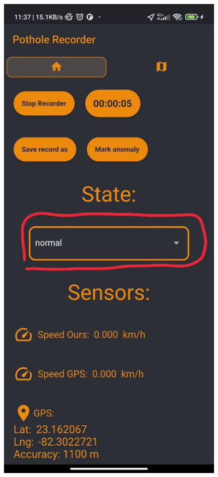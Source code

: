	\begin{figure}[htb]
		\centering
		\includegraphics[scale = 0.2]{Graphics/apk_change_state_1.jpg}

\end{figure}
